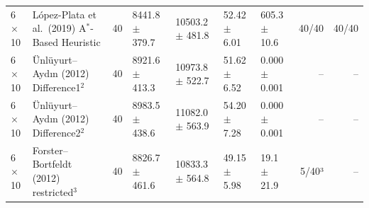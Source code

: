 \begin{table}[htbp]
\begin{tabular}{llrllllrr}
6$\times$10 & L\'{o}pez-Plata et al.\ (2019) A$^\ast$-Based Heuristic & 40 & 8441.8 $\pm$ 379.7 & 10503.2 $\pm$ 481.8 & 52.42 $\pm$ 6.01 & 605.3 $\pm$ 10.6 & 40/40 & 40/40 \\
6$\times$10 & \"{U}nl\"{u}yurt--Ayd\i{}n (2012) Difference1$^{2}$ & 40 & 8921.6 $\pm$ 413.3 & 10973.8 $\pm$ 522.7 & 51.62 $\pm$ 6.52 & 0.000 $\pm$ 0.001 & -- & -- \\
6$\times$10 & \"{U}nl\"{u}yurt--Ayd\i{}n (2012) Difference2$^{2}$ & 40 & 8983.5 $\pm$ 438.6 & 11082.0 $\pm$ 563.9 & 54.20 $\pm$ 7.28 & 0.000 $\pm$ 0.001 & -- & -- \\
6$\times$10 & Forster--Bortfeldt (2012) restricted$^{3}$ & 40 & 8826.7 $\pm$ 461.6 & 10833.3 $\pm$ 564.8 & 49.15 $\pm$ 5.98 & 19.1 $\pm$ 21.9 & 5/40³ & -- \\
\bottomrule
\end{tabular}

\end{table}
